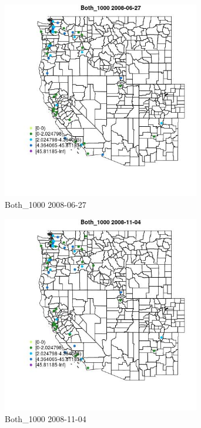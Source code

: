 \begin{figure} 
\centering  
\includegraphics[width=0.77\textwidth]{Code_Outputs/Report_ML_input_PM25_Step4_part_e_de_duplicated_aves_MapObsBoth_10002008-06-27.jpg} 
\caption{\label{fig:Report_ML_input_PM25_Step4_part_e_de_duplicated_avesMapObsBoth_10002008-06-27}Both_1000 2008-06-27} 
\end{figure} 
 

\begin{figure} 
\centering  
\includegraphics[width=0.77\textwidth]{Code_Outputs/Report_ML_input_PM25_Step4_part_e_de_duplicated_aves_MapObsBoth_10002008-11-04.jpg} 
\caption{\label{fig:Report_ML_input_PM25_Step4_part_e_de_duplicated_avesMapObsBoth_10002008-11-04}Both_1000 2008-11-04} 
\end{figure} 
 

